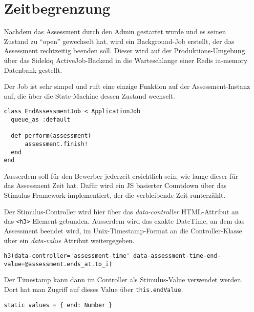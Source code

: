 \section{Zeitbegrenzung}

Nachdem das Assessment durch den Admin gestartet wurde und es seinen Zustand zu \enquote{open} gewechselt hat, wird
ein Background-Job erstellt, der das Assessment rechtzeitig beenden soll. Dieser wird auf der Produktions-Umgebung 
über das Sidekiq ActiveJob-Backend in die Warteschlange einer Redis in-memory Datenbank gestellt. 

Der Job ist sehr simpel und ruft eine einzige Funktion auf der Assessment-Instanz auf, 
die über die State-Machine dessen Zustand wechselt. 

\begin{codebox}
\begin{verbatim}
class EndAssessmentJob < ApplicationJob
  queue_as :default

  def perform(assessment)
      assessment.finish!
  end
end
\end{verbatim}
\end{codebox}

Ausserdem soll für den Bewerber jederzeit ersichtlich sein, wie lange dieser für das Assessment Zeit hat. 
Dafür wird ein JS basierter Countdown über das Stimulus Framework implementiert, der die verbleibende Zeit runterzählt.

Der Stimulus-Controller wird hier über das \emph{data-controller} HTML-Attribut an das \texttt{<h3>} Element gebunden.
Ausserdem wird das exakte DateTime, an dem das Assessment beendet wird, im Unix-Timestamp-Format an die Controller-Klasse über ein \emph{data-value} Attribut weitergegeben.

\begin{codebox}
\begin{verbatim}
h3(data-controller='assessment-time' data-assessment-time-end-value=@assessment.ends_at.to_i)
\end{verbatim}
\end{codebox}

Der Timestamp kann dann im Controller als Stimulus-Value verwendet werden. Dort hat man Zugriff auf dieses Value über
\texttt{this.endValue}.

\begin{codebox}
\begin{verbatim}
static values = { end: Number }
  
\end{verbatim}
\end{codebox}


